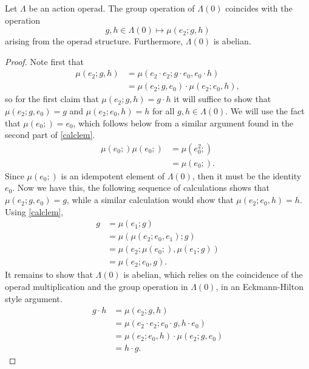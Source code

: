 \begin{lem}\label{G0abel}
Let $\Lambda$ be an action operad. The group operation of $\Lambda(0)$ coincides with the operation 
  \[
    g, h \in \Lambda(0) \mapsto \mu(e_2; g, h)
  \]
arising from the operad structure. Furthermore, $\Lambda(0)$ is abelian.
\end{lem}
\begin{proof}
  Note first that
    \begin{align*}
      \mu(e_2; g, h) &= \mu(e_2 \cdot e_2; g \cdot e_0, e_0 \cdot h) \\
      &= \mu(e_2; g, e_0) \cdot \mu(e_2; e_0, h),
    \end{align*}
  so for the first claim that $\mu(e_2; g, h) = g \cdot h$ it will suffice to show that $\mu(e_2; g, e_0) = g$ and $\mu(e_2; e_0, h) = h$ for all $g, h \in \Lambda(0)$. We will use the fact that $\mu(e_0; ) = e_0$, which follows below from a similar argument found in the second part of \cref{calclem}.
    \begin{align*}
      \mu(e_0;)\mu(e_0;) &= \mu\left(e_0^2;\right) \\
      &= \mu(e_0;).
    \end{align*}
  Since $\mu(e_0;)$ is an idempotent element of $\Lambda(0)$, then it must be the identity $e_0$. Now we have this, the following sequence of calculations shows that $\mu(e_2; g, e_0) = g$, while a similar calculation would show that $\mu(e_2; e_0, h) = h$. Using \cref{calclem},
    \begin{align*}
      g &= \mu(e_1; g) \\
      &= \mu(\mu(e_2; e_0, e_1); g) \\
      &= \mu(e_2; \mu(e_0;), \mu(e_1; g)) \\
      &= \mu(e_2; e_0, g).
    \end{align*}
  It remains to show that $\Lambda(0)$ is abelian, which relies on the coincidence of the operad multiplication and the group operation in $\Lambda(0)$, in an Eckmann-Hilton style argument.
    \begin{align*}
      g \cdot h &= \mu(e_2; g, h) \\
      &= \mu(e_2 \cdot e_2; e_0 \cdot g, h \cdot e_0) \\
      &= \mu(e_2; e_0, h) \cdot \mu(e_2; g, e_0) \\
      &= h \cdot g.
    \end{align*}
\end{proof}

